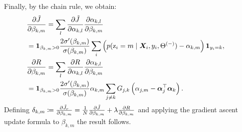 Finally, by the chain rule, we obtain:
\begin{align}
\lefteqn{\frac{\partial \tilde{J}}{\partial \beta_{k,m}} = \sum_l \frac{\partial \tilde{J}}{\partial \alpha_{k,l}} \frac{\partial \alpha_{k,l}}{\partial \beta_{k,m}}} \nonumber\\
&= \1_{\beta_{k,m} > 0} \frac{2\sigma'(\beta_{k,m})}{\sigma(\beta_{k,m})} \sum_i  \left(p(\rz_i=m \mid \mX_i,y_i,\Theta^{(-)}) -\alpha_{k,m}\right)\1_{y_i=k}, \\
\lefteqn{\frac{\partial R}{\partial \beta_{k,m}} = \sum_l \frac{\partial R}{\partial \alpha_{k,l}} \frac{\partial \alpha_{k,l}}{\partial \beta_{k,m}}} \nonumber\\
&= \1_{\beta_{k,m} > 0} \frac{2\sigma'(\beta_{k,m})}{\sigma(\beta_{k,m})} \alpha_{k,m}\sum_{j \neq k} \emG_{j,k}\left(\alpha_{j,m} - \valpha_j \transp \valpha_k \right).
\end{align}
Defining $\delta_{k,m} \coloneqq \frac{\partial \tilde{J}_r}{\partial \beta_{k,m}} = \frac{1}{N}\frac{\partial \tilde{J}}{\partial \beta_{k,m}} + \lambda \frac{\partial R}{\partial \beta_{k,m}}$ and applying the gradient ascent update formula to $\beta_{k,m}$ the result follows.

